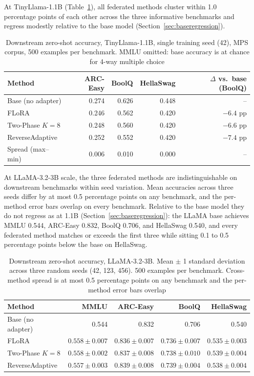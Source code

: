 \documentclass[iicol,pdflatex,sn-mathphys-num]{sn-jnl}
\begin{document}
At TinyLlama-1.1B (Table~\ref{tab:downstream_tiny}), all federated methods cluster within 1.0 percentage points of each other across the three informative benchmarks and regress modestly relative to the base model (Section~\ref{sec:baseregression}).

\begin{table}[tbp]
\centering
\footnotesize
\setlength{\tabcolsep}{6pt}
\caption{Downstream zero-shot accuracy, TinyLlama-1.1B, single training seed (42), MPS corpus, 500 examples per benchmark. MMLU omitted: base accuracy is at chance for 4-way multiple choice}
\label{tab:downstream_tiny}
\begin{tabular}{@{}lrrrr@{}}
\toprule
Method & ARC-Easy & BoolQ & HellaSwag & $\Delta$ vs.\ base (BoolQ) \\
\midrule
Base (no adapter) & 0.274 & 0.626 & 0.448 & -- \\
FLoRA             & 0.246 & 0.562 & 0.420 & $-6.4$ pp \\
Two-Phase $K{=}8$ & 0.248 & 0.560 & 0.420 & $-6.6$ pp \\
ReverseAdaptive   & 0.252 & 0.552 & 0.420 & $-7.4$ pp \\
\midrule
Spread (max--min) & 0.006 & 0.010 & 0.000 & -- \\
\bottomrule
\end{tabular}
\end{table}

At LLaMA-3.2-3B scale, the three federated methods are indistinguishable on downstream benchmarks within seed variation. Mean accuracies across three seeds differ by at most 0.5 percentage points on any benchmark, and the per-method error bars overlap on every benchmark. Relative to the base model they do not regress as at 1.1B (Section~\ref{sec:baseregression}): the LLaMA base achieves MMLU 0.544, ARC-Easy 0.832, BoolQ 0.706, and HellaSwag 0.540, and every federated method matches or exceeds the first three while sitting 0.1 to 0.5 percentage points below the base on HellaSwag.

\begin{table}[bp]
\centering
\footnotesize
\setlength{\tabcolsep}{6pt}
\caption{Downstream zero-shot accuracy, LLaMA-3.2-3B. Mean $\pm$ 1 standard deviation across three random seeds (42, 123, 456). 500 examples per benchmark. Cross-method spread is at most 0.5 percentage points on any benchmark and the per-method error bars overlap}
\label{tab:downstream_llama}
\begin{tabular}{@{}lrrrr@{}}
\toprule
Method & MMLU & ARC-Easy & BoolQ & HellaSwag \\
\midrule
Base (no adapter) & 0.544 & 0.832 & 0.706 & 0.540 \\
FLoRA             & $0.558 \pm 0.007$ & $0.836 \pm 0.007$ & $0.736 \pm 0.007$ & $0.535 \pm 0.003$ \\
Two-Phase $K{=}8$ & $0.558 \pm 0.002$ & $0.837 \pm 0.008$ & $0.738 \pm 0.010$ & $0.539 \pm 0.004$ \\
ReverseAdaptive   & $0.557 \pm 0.003$ & $0.839 \pm 0.008$ & $0.739 \pm 0.004$ & $0.538 \pm 0.004$ \\
\bottomrule
\end{tabular}
\end{table}
\end{document}
